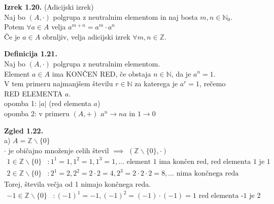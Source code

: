 \documentclass[12pt]{article}
\begin{document}
\noindent
\textbf{Izrek 1.20.} (Adicijski izrek) \\
Naj bo $(A, \cdot)$ polgrupa z neutralnim elementom in naj bosta $m, n \in \mathbb{N}_0$. \\
Potem $\forall a \in A$ velja $a^{m + n} = a^m \cdot a^n$ \\
Če je $a \in A$ obrnljiv, velja adicijski izrek $\forall m, n \in \mathbb{Z}$.



\vspace*{24pt}


\noindent
\textbf{Definicija 1.21.} \\
Naj bo $(A, \cdot)$ polgrupa z neutralnim elementom. \\
Element $a \in A$ ima KONČEN RED, če obstaja $n \in \mathbb{N}$, da je $a^n = 1$. \\
V tem primeru najmanjšem številu $r \in \mathbb{N}$ za katerega je $a^r = 1$, rečemo \\
RED ELEMENTA $a$. \\[1em]
opomba 1: $|a|$ (red elementa $a$) \\
opomba 2: v primeru $(A, +)$ $a^n \to na$ in $1 \to 0$



\vspace*{24pt}


\noindent
\textbf{Zgled 1.22.} \\[1em]
a)  $A = \mathbb{Z} \backslash \{ 0 \}$ \\
\hspace*{1em} $\cdot$ je običajno množenje celih števil $\implies$ $(\mathbb{Z} \backslash \{0\}, \cdot)$ 
\begin{align*}
    1 \in \mathbb{Z} \backslash \{0\} &: 1^1 = 1, 1^2 = 1, 1^3 = 1, \dots \text{ element 1 ima končen red, red elementa 1 je 1} \\
    2 \in \mathbb{Z} \backslash \{0\} &: 2^1 = 2, 2^2 = 2 \cdot 2 = 4, 2^3 = 2 \cdot 2 \cdot 2 = 8, \dots \text{ nima končnega reda}
\end{align*}
Torej, števila večja od 1 nimajo končnega reda.
\begin{align*}
    -1 \in \mathbb{Z} \backslash \{0\} &: (-1)^1 = -1, (-1)^2 = (-1) \cdot (-1) = 1 \text{ red elementa -1 je 2}
\end{align*} \\
\end{document}
